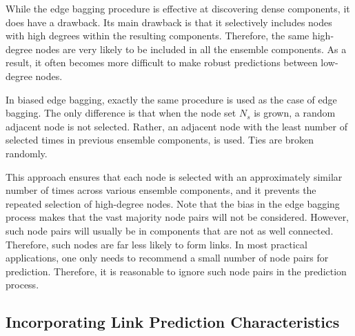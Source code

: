 While the edge bagging procedure is effective at discovering dense
components, it does have a drawback. Its main drawback is that  it
selectively includes nodes with  high degrees within the resulting
components.  Therefore, the same high-degree nodes are very likely to be included in
all the ensemble components.  As a result, it often becomes more
difficult to make robust predictions between low-degree nodes.

In biased edge bagging, exactly the same procedure is used as the case
of edge bagging.  The only difference is that when the node set
$N_s$ is grown, a random adjacent node is not selected. Rather, an
adjacent node with the least number of selected times
in previous ensemble components, is used. Ties are broken randomly.

This approach ensures  that each node is selected with an approximately
similar number of times across various ensemble components, and it
prevents the repeated selection of high-degree nodes.
%
Note that the
bias in the edge bagging process makes that the vast majority node
pairs will not be considered.
However, such node pairs will usually be in components that are not
as well connected. Therefore, such nodes  are far less likely to
form links. In most practical applications, one only needs to
recommend a small number of node pairs for prediction.  Therefore,
it is reasonable to ignore such node pairs in the prediction
process.



\subsection{Incorporating Link Prediction Characteristics}


